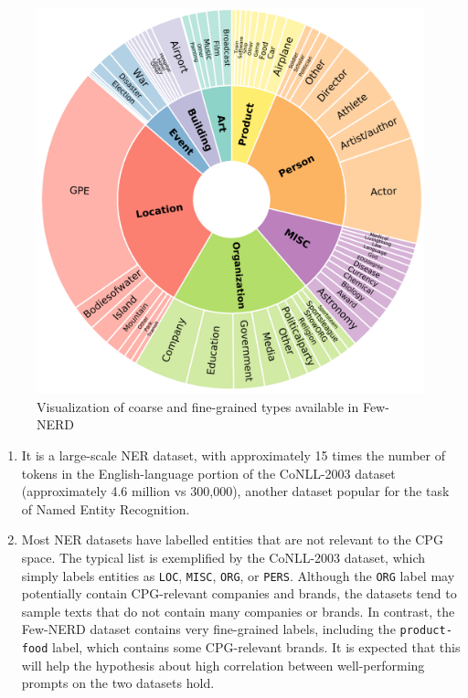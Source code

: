 \documentclass[a4paper, 11pt]{article}
\begin{document}
\begin{figure}
\centering
\includegraphics[scale=0.33]{few-nerd-types}
\caption{Visualization of coarse and fine-grained types available in Few-NERD}
\label{fig:few-nerd-types}
\end{figure}


\begin{enumerate}
\item It is a large-scale NER dataset, with approximately 15 times the number of tokens in the English-language portion of the CoNLL-2003 dataset\cite{conll-2003} (approximately 4.6 million vs 300,000), another dataset popular for the task of Named Entity Recognition.
\item Most NER datasets have labelled entities that are not relevant to the CPG space. The typical list is exemplified by the CoNLL-2003 dataset, which simply labels entities as \verb|LOC|, \verb|MISC|, \verb|ORG|, or \verb|PERS|. Although the \verb|ORG| label may potentially contain CPG-relevant companies and brands, the datasets tend to sample texts that do not contain many companies or brands. In contrast, the Few-NERD dataset contains very fine-grained labels, including the \verb|product-food| label, which contains some CPG-relevant brands. It is expected that this will help the hypothesis about high correlation between well-performing prompts on the two datasets hold.
\end{enumerate}
\end{document}

